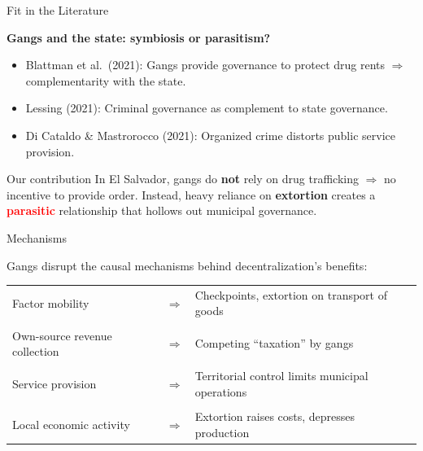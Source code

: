 \documentclass[10pt, hyperref={pdfpagelabels=false}]{beamer}
\begin{document}
\begin{frame}{Fit in the Literature}

\textbf{Gangs and the state: symbiosis or parasitism?}

\begin{itemize}

\item[\textcolor{mygray}{\textbullet}] \textcolor{mygray}{Blattman et al.\ (2021): Gangs provide governance to protect drug rents $\Rightarrow$ complementarity with the state.}

\item[\textcolor{mygray}{\textbullet}] \textcolor{mygray}{Lessing (2021): Criminal governance as complement to state governance.}

\item[\textcolor{mygray}{\textbullet}] \textcolor{mygray}{Di Cataldo \& Mastrorocco (2021): Organized crime distorts public service provision.}

\end{itemize}

\pause

\begin{block}{Our contribution}
In El Salvador, gangs do \textbf{not} rely on drug trafficking $\Rightarrow$ no incentive to provide order. Instead, heavy reliance on \textcolor{myblue}{\textbf{extortion}} creates a \textcolor{red}{\textbf{parasitic}} relationship that hollows out municipal governance.
\end{block}

\end{frame}


\begin{frame}{Mechanisms}

Gangs disrupt the causal mechanisms behind decentralization's benefits:

\bigskip

\begin{tabular}{lcp{6cm}}
\textcolor{myblue}{Factor mobility} & $\Rightarrow$ & Checkpoints, extortion on transport of goods \\
\\
\textcolor{myblue}{Own-source revenue collection} & $\Rightarrow$ & Competing ``taxation'' by gangs \\
\\
\textcolor{myblue}{Service provision} & $\Rightarrow$ & Territorial control limits municipal operations \\
\\
\textcolor{myblue}{Local economic activity} & $\Rightarrow$ & Extortion raises costs, depresses production \\
\end{tabular}

\end{frame}
\end{document}
